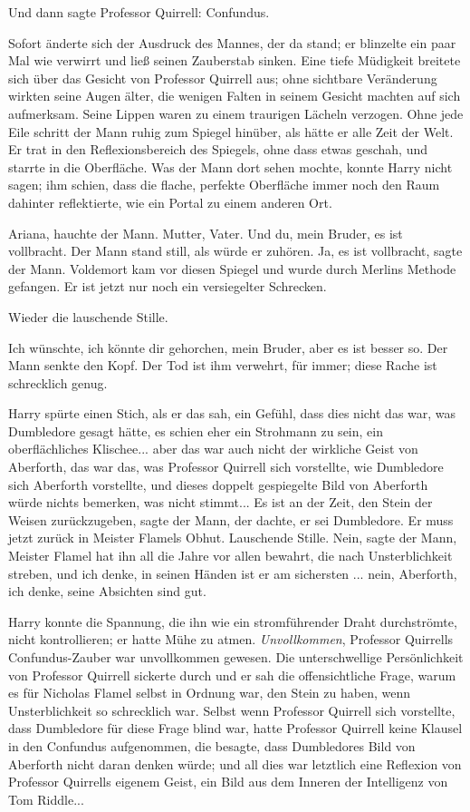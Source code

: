 Und dann sagte Professor Quirrell: \glqq{}Confundus.\grqq{}

Sofort änderte sich der Ausdruck des Mannes, der da stand; er blinzelte ein paar
Mal wie verwirrt und ließ seinen Zauberstab sinken. Eine tiefe Müdigkeit
breitete sich über das Gesicht von Professor Quirrell aus; ohne sichtbare
Veränderung wirkten seine Augen älter, die wenigen Falten in seinem Gesicht
machten auf sich aufmerksam. Seine Lippen waren zu einem traurigen Lächeln
verzogen. Ohne jede Eile schritt der Mann ruhig zum Spiegel hinüber, als hätte
er alle Zeit der Welt. Er trat in den Reflexionsbereich des Spiegels, ohne dass
etwas geschah, und starrte in die Oberfläche. Was der Mann dort sehen mochte,
konnte Harry nicht sagen; ihm schien, dass die flache, perfekte Oberfläche immer
noch den Raum dahinter reflektierte, wie ein Portal zu einem anderen Ort.

\glqq{}Ariana\grqq{}, hauchte der Mann. \glqq{}Mutter, Vater. Und du, mein Bruder,
es ist vollbracht.\grqq{} Der Mann stand still, als würde er zuhören. \glqq{}Ja,
es ist vollbracht\grqq{}, sagte der Mann. \glqq{}Voldemort kam vor diesen Spiegel
und wurde durch Merlins Methode gefangen. Er ist jetzt nur noch ein versiegelter
Schrecken.\grqq{}

Wieder die lauschende Stille.

\glqq{}Ich wünschte, ich könnte dir gehorchen, mein Bruder, aber es ist besser
so.\grqq{} Der Mann senkte den Kopf. \glqq{}Der Tod ist ihm verwehrt, für immer;
diese Rache ist schrecklich genug.\grqq{}

Harry spürte einen Stich, als er das sah, ein Gefühl, dass dies nicht das war,
was Dumbledore gesagt hätte, es schien eher ein Strohmann zu sein, ein
oberflächliches Klischee... aber das war auch nicht der wirkliche Geist von
Aberforth, das war das, was Professor Quirrell sich vorstellte, wie Dumbledore
sich Aberforth vorstellte, und dieses doppelt gespiegelte Bild von Aberforth
würde nichts bemerken, was nicht stimmt... \glqq{}Es ist an der Zeit, den Stein
der Weisen zurückzugeben\grqq{}, sagte der Mann, der dachte, er sei Dumbledore.
\glqq{}Er muss jetzt zurück in Meister Flamels Obhut.\grqq{} Lauschende Stille.
\glqq{}Nein\grqq{}, sagte der Mann, \glqq{}Meister Flamel hat ihn all die Jahre
vor allen bewahrt, die nach Unsterblichkeit streben, und ich denke, in seinen
Händen ist er am sichersten ... nein, Aberforth, ich denke, seine Absichten sind
gut.\grqq{}

Harry konnte die Spannung, die ihn wie ein stromführender Draht durchströmte,
nicht kontrollieren; er hatte Mühe zu atmen. \emph{Unvollkommen}, Professor
Quirrells Confundus-Zauber war unvollkommen gewesen. Die unterschwellige
Persönlichkeit von Professor Quirrell sickerte durch und er sah die
offensichtliche Frage, warum es für Nicholas Flamel selbst in Ordnung war, den
Stein zu haben, wenn Unsterblichkeit so schrecklich war. Selbst wenn Professor
Quirrell sich vorstellte, dass Dumbledore für diese Frage blind war, hatte
Professor Quirrell keine Klausel in den Confundus aufgenommen, die besagte, dass
Dumbledores Bild von Aberforth nicht daran denken würde; und all dies war
letztlich eine Reflexion von Professor Quirrells eigenem Geist, ein Bild aus dem
Inneren der Intelligenz von Tom Riddle...

